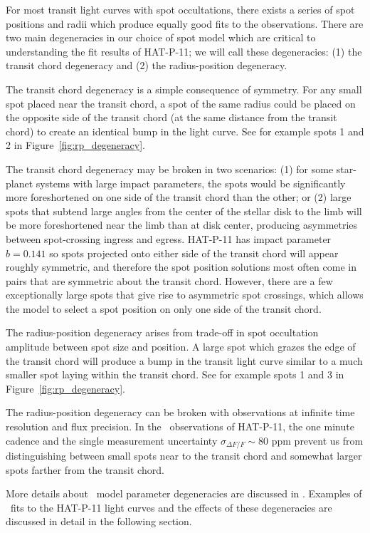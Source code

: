 For most transit light curves with spot occultations, there exists a series of spot positions and radii which produce equally good fits to the observations. There are two main degeneracies in our choice of spot model which are critical to understanding the fit results of HAT-P-11; we will call these degeneracies: (1) the transit chord degeneracy and (2) the radius-position degeneracy. 

The transit chord degeneracy is a simple consequence of symmetry. For any small spot placed near the transit chord, a spot of the same radius could be placed on the opposite side of the transit chord (at the same distance from the transit chord) to create an identical bump in the light curve. See for example spots 1 and 2 in Figure~\ref{fig:rp_degeneracy}. 

The transit chord degeneracy may be broken in two scenarios: (1) for some star-planet systems with large impact parameters, the spots would be significantly more foreshortened on one side of the transit chord than the other; or (2) large spots that subtend large angles from the center of the stellar disk to the limb will be more foreshortened near the limb than at disk center, producing asymmetries between spot-crossing ingress and egress. HAT-P-11 has impact parameter $b = 0.141$ so spots projected onto either side of the transit chord will appear roughly symmetric, and therefore the spot position solutions most often come in pairs that are symmetric about the transit chord. However, there are a few exceptionally large spots that give rise to asymmetric spot crossings, which allows the model to select a spot position on only one side of the transit chord.

The radius-position degeneracy arises from trade-off in spot occultation amplitude between spot size and position. A large spot which grazes the edge of the transit chord will produce a bump in the transit light curve similar to a much smaller spot laying within the transit chord. See for example spots 1 and 3 in Figure~\ref{fig:rp_degeneracy}. 

The radius-position degeneracy can be broken with observations at infinite time resolution and flux precision. In the \kepler\ observations of HAT-P-11, the one minute cadence and the single measurement uncertainty $\sigma_{\Delta F / F} \sim 80$ ppm prevent us from distinguishing between small spots near to the transit chord and somewhat larger spots farther from the transit chord. 

More details about \stsp\ model parameter degeneracies are discussed in \citet{Hebb2017}. Examples of \stsp\ fits to the HAT-P-11 light curves and the effects of these degeneracies are discussed in detail in the following section.

